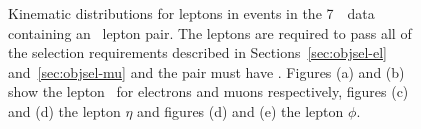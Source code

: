 \begin{figure}[h]
{        }
    \caption[Lepton kinematic distributions for \dilep\ events in the 7~\tev\
    data. ]
    {\small Kinematic distributions for leptons in events in the 7~\tev\
    data containing an \ossf\ lepton pair. The leptons are required to pass all of the selection
    requirements described in Sections~\ref{sec:objsel-el}
    and~\ref{sec:objsel-mu} and the pair must have \sstooos. 
    Figures (a) and (b) show the lepton \pt\ for electrons and muons
    respectively, figures (c) and (d) the lepton $\eta$ and figures (d) and (e)
    the lepton $\phi$.    }
\label{fig:dilep-lepkin-seven}
\end{figure}

